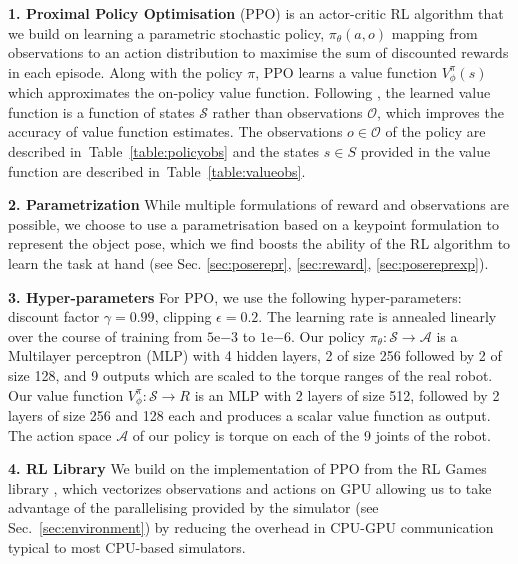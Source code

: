 \documentclass[letterpaper, 10 pt, conference]{ieeeconf}  %
\newcommand{\secref}[1]{Sec.~\ref{#1}}
\newcommand{\tabref}[1]{Table~\ref{#1}}
\begin{document}
\noindent \textbf{1. Proximal Policy Optimisation} (PPO) is an actor-critic RL algorithm \citep{schulman2017proximal} that we build on learning a parametric stochastic policy, $\pi_\theta(a, o)$ mapping from observations to an action distribution to maximise the sum of discounted rewards in each episode. Along with the policy $\pi$, PPO learns a value function $V^{\pi}_\phi(s)$ which approximates the on-policy value function. Following \citep{asymmetric-ac}, the learned value function is a function of states $\mathcal S$ rather than observations $\mathcal O$, which improves the accuracy of value function estimates. The observations $o \in \mathcal O$ of the policy are described in~\tabref{table:policyobs} and the states $s \in S$ provided in the value function are described in~\tabref{table:valueobs}.

\noindent \textbf{2. Parametrization} While multiple formulations of reward and observations are possible, we choose to use a parametrisation based on a keypoint formulation to represent the object pose, which we find boosts the ability of the RL algorithm to learn the task at hand (see Sec. \ref{sec:poserepr}, \ref{sec:reward}, \ref{sec:posereprexp}).


\noindent \textbf{3. Hyper-parameters} For PPO, we use the following hyper-parameters: discount factor $\gamma=0.99$, clipping $\epsilon=0.2$. The learning rate is annealed linearly over the course of training from $5\mathrm{e}{-3}$ to $1\mathrm{e}{-6}$. Our policy $\pi_\theta: \mathcal S \to \mathcal A$ is a Multilayer perceptron (MLP) with 4 hidden layers, 2 of size 256 followed by 2 of size 128, and 9 outputs which are scaled to the torque ranges of the real robot. Our value function  $V^\pi_\phi: \mathcal S \to R$ is an MLP with 2 layers of size 512, followed by 2 layers of size 256 and 128 each and produces a scalar value function as output. The action space $\mathcal A$ of our policy is torque on each of the 9 joints of the robot. 

\noindent \textbf{4. RL Library} We build on the implementation of PPO from the RL Games library \citep{rl-games}, which vectorizes observations and actions on GPU allowing us to take advantage of the parallelising provided by the simulator (see \secref{sec:environment}) by reducing the overhead in CPU-GPU communication typical to most CPU-based simulators. 

\vspace{-6pt}
\end{document}
